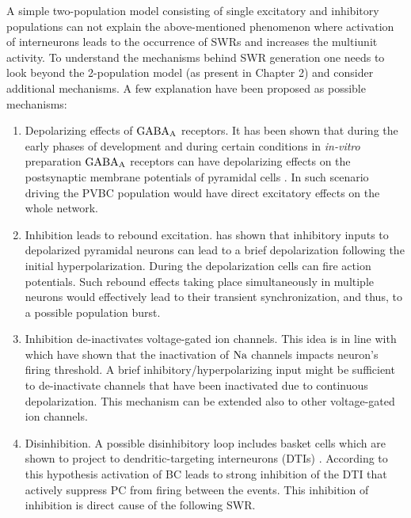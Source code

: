    A simple two-population model consisting of single excitatory and
    inhibitory populations can not explain the above-mentioned phenomenon where
    activation of interneurons leads to the occurrence of SWRs and increases
    the multiunit activity. To understand the mechanisms behind SWR generation
    one needs to look beyond the 2-population model (as present in Chapter 2)
    and consider additional mechanisms. A few explanation have been proposed as
    possible mechanisms:
    \begin{enumerate}
      \item Depolarizing effects of $\rm GABA_A$ receptors. It has been shown
        that during the early phases of development and during certain
        conditions in {\it in-vitro} preparation $\rm GABA_A$ receptors can have
        depolarizing effects on the postsynaptic membrane potentials of
        pyramidal cells \citep{Cohen2002, Gulledge2003, Banke2006,
        Szabadics2006}. In such scenario driving the PVBC population would have
        direct excitatory effects on the whole network.
      \item Inhibition leads to rebound excitation. \cite{Cobb95} has shown
        that inhibitory inputs to depolarized pyramidal neurons can lead to a
        brief depolarization following the initial hyperpolarization. During
        the depolarization cells can fire action potentials. Such rebound
        effects taking place simultaneously in multiple neurons would
        effectively lead to their transient synchronization, and thus, to a
        possible population burst.
      \item Inhibition de-inactivates voltage-gated ion channels.
        This idea is in line with \cite{Platkiewicz2011} which have shown that
        the inactivation of $\rm Na$ channels impacts neuron's firing threshold. A
        brief inhibitory/hyperpolarizing input might be sufficient to
        de-inactivate channels that have been inactivated due to continuous
        depolarization. This mechanism can be extended also to other
        voltage-gated ion channels. 
      \item Disinhibition. A possible disinhibitory loop includes basket cells
        which are shown to project to dendritic-targeting interneurons (DTIs)
        \citep{Cobb97, Kohus2016}. According to this hypothesis activation of
        BC leads to strong inhibition of the DTI that actively suppress PC from
        firing between the events. This inhibition of inhibition is direct
        cause of the following SWR.
    \end{enumerate}
    
